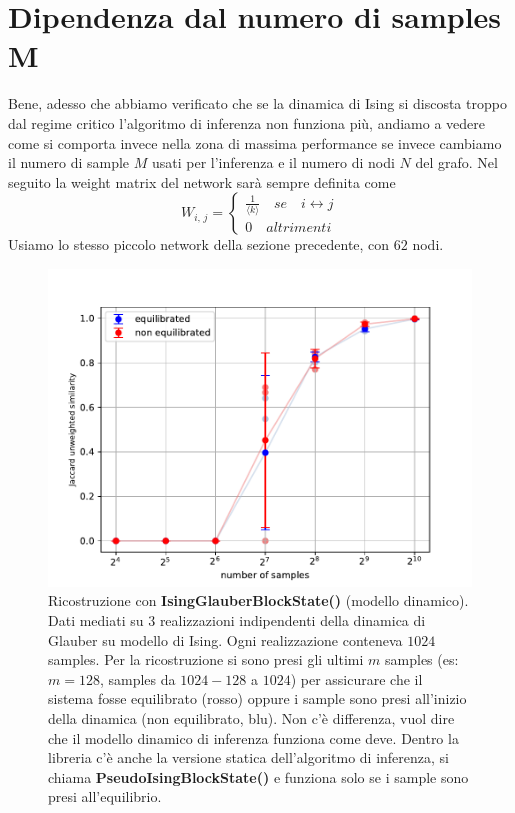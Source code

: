 \documentclass{article}
\begin{document}
\section{Dipendenza dal numero di samples M}
Bene, adesso che abbiamo verificato che se la dinamica di Ising si discosta troppo dal regime critico l'algoritmo di inferenza non funziona più, andiamo a vedere come si comporta invece nella zona di massima performance se invece cambiamo il numero di sample $M$ usati per l'inferenza e il numero di nodi $N$ del grafo.
Nel seguito la weight matrix del network sarà sempre definita come 
\begin{equation}
    W_{i,\,j} =
    \begin{cases}
         \frac{1}{\langle k \rangle} \quad se \quad i\longleftrightarrow j \\
    0 \quad altrimenti
    \end{cases}
\end{equation}
Usiamo lo stesso piccolo network della sezione precedente, con $62$ nodi. 
\begin{figure}[H]
    \centering
    \includegraphics[width=\linewidth]{images/sampling.pdf}
    \caption{Ricostruzione con \textbf{IsingGlauberBlockState()} (modello dinamico).
     Dati mediati su $3$ realizzazioni indipendenti della dinamica di Glauber su modello di Ising. Ogni realizzazione conteneva $1024$ samples. Per la ricostruzione si sono presi gli ultimi $m$ samples (es: $m = 128$, samples da $1024-128$ a $1024$) per assicurare che il sistema fosse equilibrato (rosso)  oppure i sample sono presi all'inizio della dinamica (non equilibrato, blu). Non c'è differenza, vuol dire che il modello dinamico di inferenza funziona come deve. Dentro la libreria c'è anche la versione statica dell'algoritmo di inferenza, si chiama \textbf{PseudoIsingBlockState()} e funziona solo se i sample sono presi all'equilibrio.}
    \label{fig:enter-label}
\end{figure}
\end{document}

